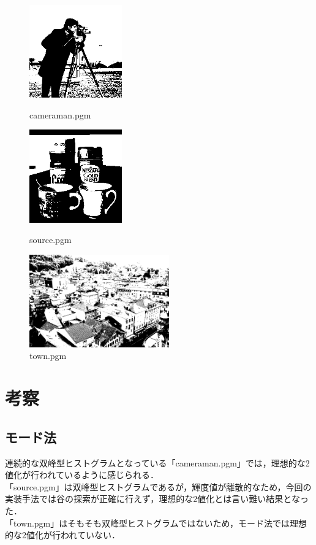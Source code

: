 \documentclass{jsarticle}
\begin{document}
\begin{figure}[htbp]
 \begin{minipage}{0.33\hsize}
  \begin{center}
   \includegraphics[height=40mm]{otsu-cameraman.png}
  \end{center}
  \caption{cameraman.pgm}
  \label{fig:one}
 \end{minipage}
 \begin{minipage}{0.33\hsize}
  \begin{center}
   \includegraphics[height=40mm]{otsu-source.png}
  \end{center}
  \caption{source.pgm}
  \label{fig:two}
 \end{minipage}
 \begin{minipage}{0.33\hsize}
  \begin{center}
   \includegraphics[height=40mm]{otsu-town.png}
  \end{center}
  \caption{town.pgm}
  \label{fig:three}
 \end{minipage}
\end{figure}


\section{考察}
\subsection{モード法}
連続的な双峰型ヒストグラムとなっている「cameraman.pgm」では，理想的な2値化が行われているように感じられる．\\
「source.pgm」は双峰型ヒストグラムであるが，輝度値が離散的なため，今回の実装手法では谷の探索が正確に行えず，理想的な2値化とは言い難い結果となった．\\
「town.pgm」はそもそも双峰型ヒストグラムではないため，モード法では理想的な2値化が行われていない．\\
\end{document}
